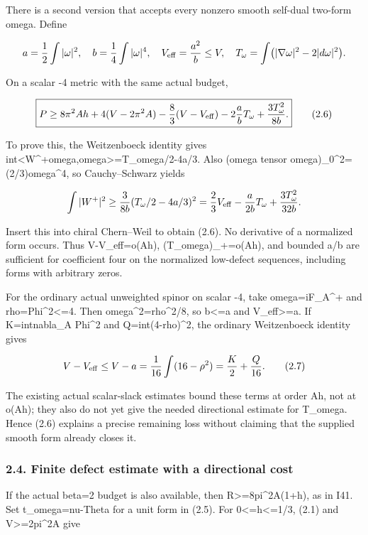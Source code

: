 \documentclass[
  10pt,
]{article}
\begin{document}
There is a second version that accepts every nonzero smooth self-dual
two-form omega. Define

\[
 a=\frac12\int|\omega|^2,\quad b=\frac14\int|\omega|^4,
 \quad V_{\rm eff}=\frac{a^2}{b}\le V,\quad
 T_\omega=\int\bigl(|\nabla\omega|^2-2|d\omega|^2\bigr).
\]

On a scalar -4 metric with the same actual budget,

\[
 \boxed{
 P\ge8\pi^2Ah+4(V-2\pi^2A)
   -\frac83(V-V_{\rm eff})-2\frac ab T_\omega
   +\frac{3T_\omega^2}{8b}.}                         \tag{2.6}
\]

To prove this, the Weitzenboeck identity gives
int\textless W\^{}+omega,omega\textgreater=T\_omega/2-4a/3. Also
\textbar(omega tensor
omega)\_0\textbar\^{}2=(2/3)\textbar omega\textbar\^{}4, so
Cauchy--Schwarz yields

\[
 \int|W^+|^2\ge\frac3{8b}(T_\omega/2-4a/3)^2
 =\frac23V_{\rm eff}-\frac{a}{2b}T_\omega
                       +\frac{3T_\omega^2}{32b}.
\]

Insert this into chiral Chern--Weil to obtain (2.6). No derivative of a
normalized form occurs. Thus V-V\_eff=o(Ah), (T\_omega)\_+=o(Ah), and
bounded a/b are sufficient for coefficient four on the normalized
low-defect sequences, including forms with arbitrary zeros.

For the ordinary actual unweighted spinor on scalar -4, take
omega=iF\_A\^{}+ and rho=\textbar Phi\textbar\^{}2\textless=4. Then
\textbar omega\textbar\^{}2=rho\^{}2/8, so b\textless=a and
V\_eff\textgreater=a. If K=int\textbar nabla\_A Phi\textbar\^{}2 and
Q=int(4-rho)\^{}2, the ordinary Weitzenboeck identity gives

\[
 V-V_{\rm eff}\le V-a
       =\frac1{16}\int(16-\rho^2)=\frac K2+\frac Q{16}. \tag{2.7}
\]

The existing actual scalar-slack estimates bound these terms at order
Ah, not at o(Ah); they also do not yet give the needed directional
estimate for T\_omega. Hence (2.6) explains a precise remaining loss
without claiming that the supplied smooth form already closes it.

\hypertarget{finite-defect-estimate-with-a-directional-cost}{%
\subsubsection{2.4. Finite defect estimate with a directional
cost}\label{finite-defect-estimate-with-a-directional-cost}}

If the actual beta=2 budget is also available, then
R\textgreater=8pi\^{}2A(1+h), as in I41. Set t\_omega=nu-Theta for a
unit form in (2.5). For 0\textless=h\textless=1/3, (2.1) and
V\textgreater=2pi\^{}2A give
\end{document}
